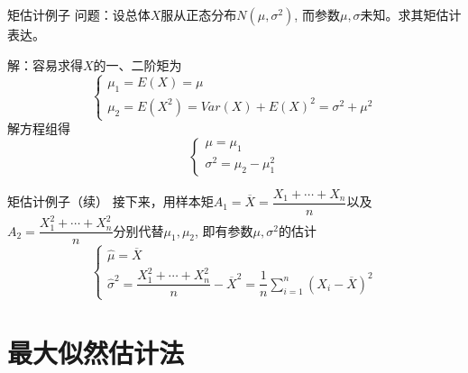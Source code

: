 
\begin{frame}

\begin{block}{矩估计例子}
问题：设总体$X$服从正态分布$N(\mu,\sigma^2)$, 而参数$\mu, \sigma$未知。求其矩估计表达。

\vspace{1em}
\pause

解：容易求得$X$的一、二阶矩为
\[
\begin{cases}
\mu_1 = E(X) = \mu \\
\mu_2 = E(X^2) = Var(X) + E(X)^2 = \sigma^2 + \mu^2
\end{cases}
\]
解方程组得
\[
\begin{cases}
\mu = \mu_1 \\
\sigma^2 = \mu_2 - \mu_1^2
\end{cases}
\]
\end{block}

\end{frame}


\begin{frame}

\begin{block}{矩估计例子（续）}
\vspace{1em}
接下来，用样本矩$A_1 = \overline{X} = \dfrac{X_1+\cdots+X_n}{n}$以及$A_2 = \dfrac{X_1^2+\cdots+X_n^2}{n}$分别代替$\mu_1,\mu_2$, 即有参数$\mu, \sigma^2$的估计
\begin{equation*}
\begin{cases}
\widehat{\mu} = \overline{X} \\
\widehat{\sigma}^2 = \dfrac{X_1^2+\cdots+X_n^2}{n} - \overline{X}^2 = \dfrac{1}{n}\sum\limits_{i=1}^n (X_i-\overline{X})^2
\end{cases}
\end{equation*}
\end{block}

\end{frame}



\section{最大似然估计法}


